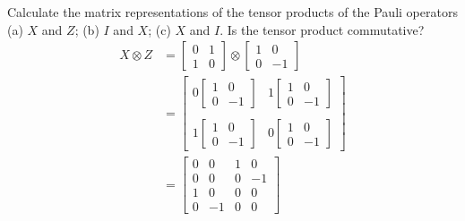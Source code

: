  Calculate the matrix representations of the tensor products of the Pauli operators (a) $X$ and $Z$; (b) $I$ and $X$; (c) $X$ and $I$. Is the tensor product commutative?
\Soln
\begin{align*}
	X \otimes Z &= \begin{bmatrix}
		0 & 1 \\
		1 & 0
	\end{bmatrix}
	\otimes
	\begin{bmatrix}
		1 & 0 \\
		0 & -1
	\end{bmatrix} \\
	&= \begin{bmatrix}
		0\begin{bmatrix}
			1 & 0 \\
			0 & -1
			\end{bmatrix}
		&
		1\begin{bmatrix}
			1 & 0 \\
			0 & -1
			\end{bmatrix}
		\\ \\
		1\begin{bmatrix}
			1 & 0 \\
			0 & -1
			\end{bmatrix}
		&
		0\begin{bmatrix}
			1 & 0 \\
			0 & -1
			\end{bmatrix}
	\end{bmatrix} \\
	&= \begin{bmatrix}
		0 & 0 & 1 & 0 \\
		0 & 0 & 0 & -1 \\
		1 & 0 & 0 & 0 \\
		0 & -1 & 0 & 0
	\end{bmatrix}
\end{align*}
